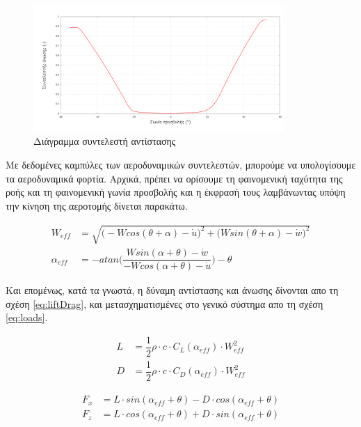 \begin{figure}[ht!]
    \begin{center}
        \includegraphics[width=0.85\textwidth]{figures/cd.pdf}
    \end{center}
    \caption{Διάγραμμα συντελεστή αντίστασης}
    \label{fig:cd}
\end{figure}

Με δεδομένες καμπύλες των αεροδυναμικών συντελεστών, μπορούμε να υπολογίσουμε τα αεροδυναμικά φορτία. Αρχικά, πρέπει να ορίσουμε τη φαινομενική ταχύτητα της ροής και τη φαινομενική γωνία προσβολής και η έκφρασή τους λαμβάνωντας υπόψη την κίνηση της αεροτομής δίνεται παρακάτω.

\begin{align}
   W_{eff} &= \sqrt{\big(-Wcos(\theta+\alpha)-\dot{u}\big)^2 + \big(Wsin(\theta+\alpha)-\dot{w})^2}\\[6pt]\label{eq:weff}
   \alpha_{eff} &= -atan\Big(\dfrac{Wsin(\alpha + \theta)-\dot{w}}{-Wcos(\alpha+\theta)-\dot{u}}\Big) - \theta\label{eq:aeff}
\end{align}

Και επομένως, κατά τα γνωστά, η δύναμη αντίστασης και άνωσης δίνονται απο τη σχέση \ref{eq:liftDrag}, και μετασχηματισμένες στο γενικό σύστημα απο τη σχέση \ref{eq:loads}.

\begin{equation}
    \begin{aligned}
    L &= \dfrac{1}{2}\rho\cdot c \cdot C_L(\alpha_{eff}) \cdot W_{eff}^2 \\
    D &= \dfrac{1}{2}\rho\cdot c \cdot C_D(\alpha_{eff}) \cdot W_{eff}^2 
    \end{aligned}
    \label{eq:liftDrag}
\end{equation}

\begin{equation}
    \begin{aligned}
    F_x &= L\cdot sin(\alpha_{eff}+\theta)-D \cdot cos(\alpha_{eff}+\theta) \\[5pt]
    F_z &= L\cdot cos(\alpha_{eff}+\theta)+D \cdot sin(\alpha_{eff}+\theta)
    \end{aligned}
    \label{eq:loads}
\end{equation}

